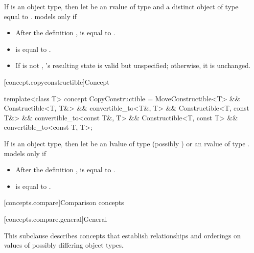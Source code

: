 \begin{itemdescr}
\pnum
If  is an object type, then let  be an rvalue of type
 and  a distinct object of type  equal to
.  models  only if

\begin{itemize}
\item After the definition ,  is equal to .

\item {} is equal to .

\item If  is not , 's resulting state is valid
but unspecified; otherwise, it is unchanged.
\end{itemize}
\end{itemdescr}

[concept.copyconstructible]{Concept }

%
\begin{itemdecl}
template<class T>
  concept CopyConstructible =
    MoveConstructible<T> &&
    Constructible<T, T&> && convertible_to<T&, T> &&
    Constructible<T, const T&> && convertible_to<const T&, T> &&
    Constructible<T, const T> && convertible_to<const T, T>;
\end{itemdecl}

\begin{itemdescr}
\pnum
If  is an object type, then let  be an lvalue of type
(possibly )  or an rvalue of type .
 models  only if

\begin{itemize}
\item After the definition ,  is equal to .

\item {} is equal to .
\end{itemize}

\end{itemdescr}

[concepts.compare]{Comparison concepts}

[concepts.compare.general]{General}

\pnum
This subclause describes concepts that establish relationships and orderings
on values of possibly differing object types.

